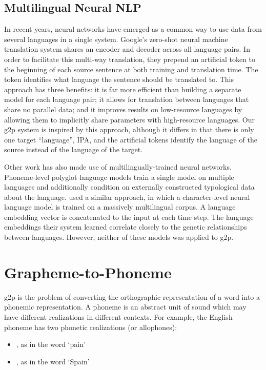 \documentclass[11pt,letterpaper]{article}
\begin{document}
\subsection{Multilingual Neural NLP}
In recent years, neural networks have emerged as a common way to use data from several languages in a single system. Google's zero-shot neural machine translation system \cite{DBLP:journals/corr/JohnsonSLKWCTVW16} shares an encoder and decoder across all language pairs. In order to facilitate this multi-way translation, they prepend an artificial token to the beginning of each source sentence at both training and translation time. The token identifies what language the sentence should be translated to. This approach has three benefits: it is far more efficient than building a separate model for each language pair; it allows for translation between languages that share no parallel data; and it improves results on low-resource languages by allowing them to implicitly share parameters with high-resource languages. Our g2p system is inspired by this approach, although it differs in that there is only one target ``language'', IPA, and the artificial tokens identify the language of the source instead of the language of the target.

Other work has also made use of multilingually-trained neural networks. Phoneme-level polyglot language models \cite{tsvetkov2016polyglot} train a single model on multiple languages and additionally condition on externally constructed typological data about the language.  used a similar approach, in which a character-level neural language model is trained on a massively multilingual corpus. A language embedding vector is concatenated to the input at each time step. The language embeddings their system learned correlate closely to the genetic relationships between languages. However, neither of these models was applied to g2p.

\section{Grapheme-to-Phoneme}
g2p is the problem of converting the orthographic representation of a word into a phonemic representation. A phoneme is an abstract unit of sound which may have different realizations in different contexts. For example, the English phoneme  has two phonetic realizations (or allophones):

\begin{itemize}
\item \textipa{[p\super h]}, as in the word `pain' \textipa{[p\super h eI n]}
\item \textipa{[p]}, as in the word `Spain' \textipa{[s p eI n]}
\end{itemize}
\end{document}
